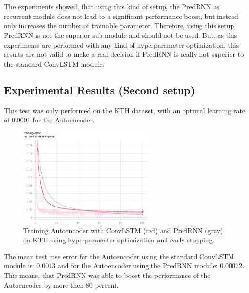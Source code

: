  \\\\
 The experiments showed, that using this kind of setup, the PredRNN as recurrent module does not lead to a significant performance boost, but instead only
 increases the number of trainable parameter. Therefore, using this setup, PredRNN is not the superior sub-module and should not be used. But, as this experiments
 are performed with any kind of hyperparameter optimization, this results are not valid to make a real decision if PredRNN is really not superior to the standard
 ConvLSTM module.

 \subsection{Experimental Results (Second setup)} \label{subsection::second_exp}
  This test was only performed on the KTH dataset, with an optimal learning rate of $0.0001$ for the Autoencoder.
  \begin{figure}[H]
   \includegraphics[width=0.6\textwidth]{../Images/exp2_training_error.png}
   \centering
   \caption{Training Autoencoder with ConvLSTM (red) and PredRNN (gray) on KTH using hyperparameter optimization and early stopping.}
   \label{fig:autoenc_exp2_training}
  \end{figure}\noindent
  The mean test mse error for the Autoencoder using the standard ConvLSTM module is: $0.0013$ and for the Autoencoder using the PredRNN module: $0.00072$.
  This means, that PredRNN was able to boost the performance of the Autoencoder by more then $80$ percent.
